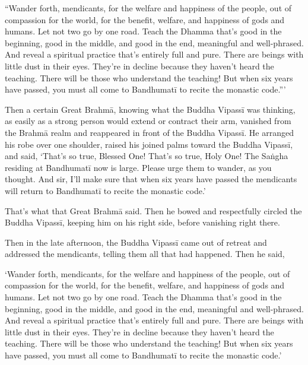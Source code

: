 \documentclass[12pt,openany]{book}%
\begin{document}
“Wander forth, mendicants, for the welfare and happiness of the people, out of compassion for the world, for the benefit, welfare, and happiness of gods and humans. Let not two go by one road. Teach the Dhamma that’s good in the beginning, good in the middle, and good in the end, meaningful and well-phrased. And reveal a spiritual practice that’s entirely full and pure. There are beings with little dust in their eyes. They’re in decline because they haven’t heard the teaching. There will be those who understand the teaching! But when six years have passed, you must all come to \textsanskrit{Bandhumatī} to recite the monastic code.”’ 

Then a certain Great \textsanskrit{Brahmā}, knowing what the Buddha \textsanskrit{Vipassī} was thinking, as easily as a strong person would extend or contract their arm, vanished from the \textsanskrit{Brahmā} realm and reappeared in front of the Buddha \textsanskrit{Vipassī}. He arranged his robe over one shoulder, raised his joined palms toward the Buddha \textsanskrit{Vipassī}, and said, ‘That’s so true, Blessed One! That’s so true, Holy One! The \textsanskrit{Saṅgha} residing at \textsanskrit{Bandhumatī} now is large. Please urge them to wander, as you thought. And sir, I’ll make sure that when six years have passed the mendicants will return to \textsanskrit{Bandhumatī} to recite the monastic code.’ 

That’s what that Great \textsanskrit{Brahmā} said. Then he bowed and respectfully circled the Buddha \textsanskrit{Vipassī}, keeping him on his right side, before vanishing right there. 

Then in the late afternoon, the Buddha \textsanskrit{Vipassī} came out of retreat and addressed the mendicants, telling them all that had happened. Then he said, 

‘Wander forth, mendicants, for the welfare and happiness of the people, out of compassion for the world, for the benefit, welfare, and happiness of gods and humans. Let not two go by one road. Teach the Dhamma that’s good in the beginning, good in the middle, and good in the end, meaningful and well-phrased. And reveal a spiritual practice that’s entirely full and pure. There are beings with little dust in their eyes. They’re in decline because they haven’t heard the teaching. There will be those who understand the teaching! But when six years have passed, you must all come to \textsanskrit{Bandhumatī} to recite the monastic code.’ 
\end{document}
